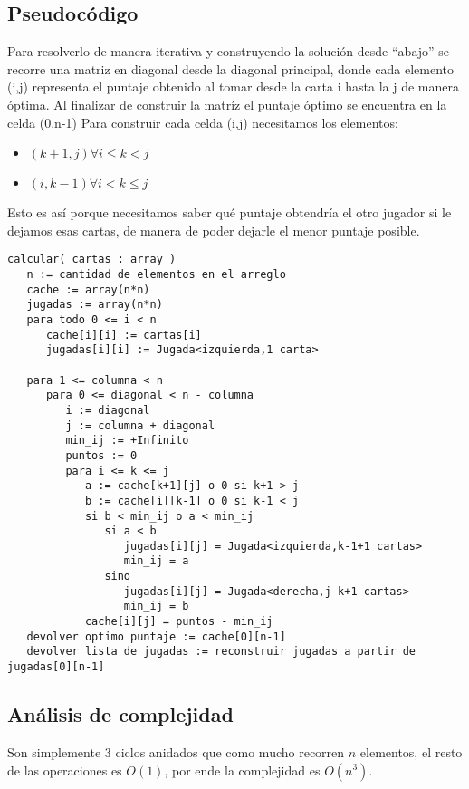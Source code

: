 \subsection{Pseudoc\'odigo}
Para resolverlo de manera iterativa y construyendo la solución desde ``abajo'' se recorre una matriz
en diagonal desde la diagonal principal, donde cada elemento (i,j) representa el puntaje obtenido
al tomar desde la carta i hasta la j de manera óptima. Al finalizar de construir la matríz el puntaje
óptimo se encuentra en la celda (0,n-1)
Para construir cada celda (i,j) necesitamos los elementos:

\begin{itemize}
   \item $(k+1,j) \forall i \le k < j$
   \item $(i,k-1) \forall i < k \le j$
\end{itemize}

Esto es así porque necesitamos saber qué puntaje obtendría el otro jugador si le dejamos esas cartas,
de manera de poder dejarle el menor puntaje posible.

\begin{verbatim}
calcular( cartas : array )
   n := cantidad de elementos en el arreglo
   cache := array(n*n)
   jugadas := array(n*n)
   para todo 0 <= i < n
      cache[i][i] := cartas[i]
      jugadas[i][i] := Jugada<izquierda,1 carta>

   para 1 <= columna < n
      para 0 <= diagonal < n - columna
         i := diagonal
         j := columna + diagonal
         min_ij := +Infinito
         puntos := 0
         para i <= k <= j
            a := cache[k+1][j] o 0 si k+1 > j
            b := cache[i][k-1] o 0 si k-1 < j
            si b < min_ij o a < min_ij
               si a < b
                  jugadas[i][j] = Jugada<izquierda,k-1+1 cartas>
                  min_ij = a
               sino
                  jugadas[i][j] = Jugada<derecha,j-k+1 cartas>
                  min_ij = b
            cache[i][j] = puntos - min_ij
   devolver optimo puntaje := cache[0][n-1]
   devolver lista de jugadas := reconstruir jugadas a partir de jugadas[0][n-1]
\end{verbatim}


\subsection{An\'alisis de complejidad}
Son simplemente 3 ciclos anidados que como mucho recorren $n$ elementos, el resto de las operaciones es $O(1)$, por
ende la complejidad es $O(n^3)$.

